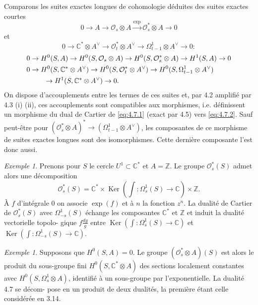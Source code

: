 \documentclass[12pt,a4paper]{article}
\theoremstyle{plain}
\theoremstyle{definition}
\theoremstyle{remark}
\newtheorem{example}[theorem]{Exemple}
\DeclareMathOperator{\Ker}{Ker}
\newcommand{\cO}{\mathcal{O}}
\newcommand{\Z}{\mathbb{Z}}
\newcommand{\C}{\mathbb{C}}
\providecommand{\cO}{\mathcal{O}}
\providecommand{\Ker}{\operatorname{Ker}}
\begin{document}
Comparons les suites exactes longues de cohomologie déduites des suites exactes
courtes
\[
0 \to A \to \cO_s \otimes A \xrightarrow{\exp} \cO_s^* \otimes A \to 0
\]
et
\[
0 \to \C^* \otimes A^\vee \to \cO_t^* \otimes A^\vee \to \Omega^1_{t-1} \otimes A^\vee \to 0 :
\]
\begin{align}
0 &\to H^0(S, A) \to H^0(S, \cO_s \otimes A) \to H^0(S, \cO_s^* \otimes A) \to H^1(S, A) \to 0 \label{eq:4.7.1} \\
0 &\to H^0(S, \C^* \otimes A^\vee) \to H^0(S, \cO_t^* \otimes A^\vee) \to H^0(S, \Omega^1_{t-1} \otimes A^\vee) \notag \\
&\qquad \to H^1(S, \C^* \otimes A^\vee) \to 0. \label{eq:4.7.2}
\end{align}
On dispose d'accouplements entre les termes de ces suites et, par 4.2 amplifié par 4.3 (i)
(ii), ces accouplements sont compatibles aux morphismes, i.e. définissent un morphisme
du dual de Cartier de \eqref{eq:4.7.1} (exact par 4.5) vers \eqref{eq:4.7.2}. Sauf peut-être pour
$(\cO_s^* \otimes A)^* \to (\Omega^1_{t-1} \otimes A^\vee)$, les composantes de ce morphisme de suites exactes longues sont
des isomorphismes. Cette dernière composante l'est donc aussi.

\begin{example}
Prenons pour $S$ le cercle $U^1 \subset \C^*$ et $A = \Z$. Le groupe $\cO_s^*(S)$
admet alors une décomposition
\[
\cO_s^*(S) = \C^* \times \Ker\left(\int : \Omega^1_s(S) \to \C\right) \times \Z.
\]
À $f$ d'intégrale $0$ on associe $\exp(f)$ et à $n$ la fonction $z^n$. La dualité de Cartier de $\cO_s^*(S)$
avec $\Omega^1_{-s}(S)$ échange les composantes $\C^*$ et $\Z$ et induit la dualité vectorielle topolo-
gique $f \frac{dg}{g}$ entre $\Ker(\int : \Omega^1_s(S) \to \C)$ et $\Ker(\int : \Omega^1_{-s}(S) \to \C)$.
\end{example}

\begin{example}
Supposons que $H^0(S, A) = 0$. Le groupe $(\cO_s^* \otimes A)(S)$ est alors le
produit du sous-groupe fini $H^0(S, \C^* \otimes A)$ des sections localement constantes avec
$H^0(S, \Omega_s^1 \otimes A)$, identifié à un sous-groupe par l'exponentielle. La dualité 4.7 se décom-
pose en un produit de deux dualités, la première étant celle considérée en 3.14.
\end{example}

\subsection{}
\end{document}
